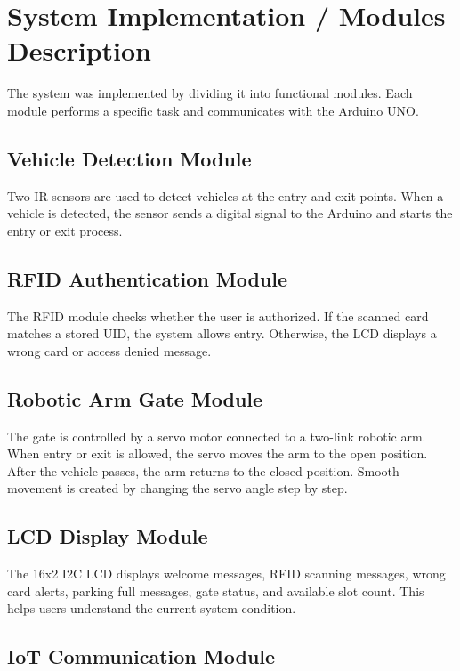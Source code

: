 \section{System Implementation / Modules Description}

The system was implemented by dividing it into functional modules. Each module performs a specific task and communicates with the Arduino UNO.

\subsection{Vehicle Detection Module}

Two IR sensors are used to detect vehicles at the entry and exit points. When a vehicle is detected, the sensor sends a digital signal to the Arduino and starts the entry or exit process.

\subsection{RFID Authentication Module}

The RFID module checks whether the user is authorized. If the scanned card matches a stored UID, the system allows entry. Otherwise, the LCD displays a wrong card or access denied message.

\subsection{Robotic Arm Gate Module}

The gate is controlled by a servo motor connected to a two-link robotic arm. When entry or exit is allowed, the servo moves the arm to the open position. After the vehicle passes, the arm returns to the closed position. Smooth movement is created by changing the servo angle step by step.

\subsection{LCD Display Module}

The 16x2 I2C LCD displays welcome messages, RFID scanning messages, wrong card alerts, parking full messages, gate status, and available slot count. This helps users understand the current system condition.

\subsection{IoT Communication Module}

